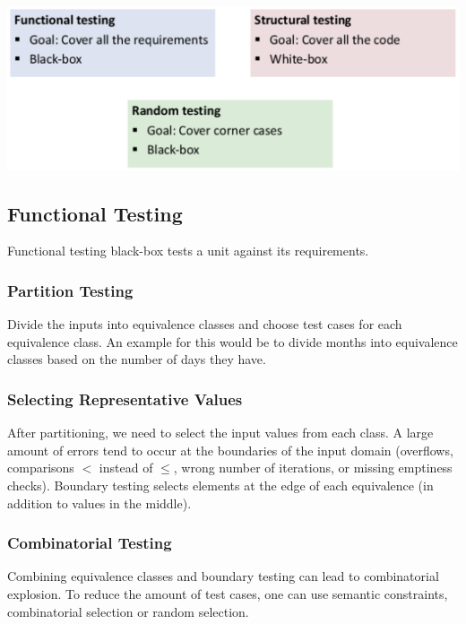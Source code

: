 \begin{center}
	\includegraphics[width=0.9\columnwidth]{assets/testing_strategies}
\end{center}


\subsection{Functional Testing}

Functional testing black-box tests a unit against its requirements.

\subsubsection{Partition Testing}

Divide the inputs into equivalence classes and choose test cases for each equivalence class. An example for this would be to divide months into equivalence classes based on the number of days they have.

\subsubsection{Selecting Representative Values}

After partitioning, we need to select the input values from each class. A large amount of errors tend to occur at the boundaries of the input domain (overflows, comparisons $<$ instead of $\leq$, wrong number of iterations, or missing emptiness checks). Boundary testing selects elements at the edge of each equivalence (in addition to values in the middle).

\subsubsection{Combinatorial Testing}

Combining equivalence classes and boundary testing can lead to combinatorial explosion. To reduce the amount of test cases, one can use semantic constraints, combinatorial selection or random selection. \\

